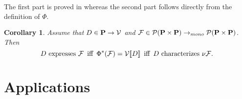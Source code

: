 \documentclass[submission]{eptcs}
\newcommand{\fun}{\rightarrow}
\newcommand{\Proc}{{\bf P}}
\newcommand{\F}{{\cal F}}
\newcommand{\V}{{\cal V}}
\newcommand{\Po}{{\cal P}}
\newcommand\lb {[\![}
\newcommand\rb{]\!]}
\newcommand{\sem}[1]{\relax\ifmmode \lb #1 \rb \else $\lb #1 \rb$ \fi}
\newcommand{\semp}{\sem}
\newtheorem{corollary}[theorem]{Corollary}
\newenvironment{proof}[1][Proof]{\begin{trivlist}
\item[\hskip \labelsep {\bfseries #1}]}{\end{trivlist}}
\begin{document}
\begin{proof}
  The first part is proved in \cite{AILS2011} whereas the second part
  follows directly from the definition of $\Phi$.
\end{proof}
\begin{corollary}\label{L:Phiiso}
  Assume that $D\in\Proc\fun\V$ and $\F\in \Po(\Proc\times
  \Proc)\fun_{mono}\Po(\Proc\times \Proc)$. Then 
\[
D \mbox{ expresses }\F\,\mbox{ iff }\,\Phi^*(\F)=\V\semp{D}
\,\mbox{ iff }\,D \mbox{ characterizes }\nu\F.
\]
\iffalse
\begin{itemize}
\item $D$ \emph{expresses}  $\F$ iff
  $\Phi^*(\F)=\V\semp{D}$, and
\item $D$ \emph{characterizes}  $\nu\F$ iff $D$ \emph{expresses}  $\F$ .
\end{itemize}\fi
 \end{corollary}
\section{Applications}
\end{document}
